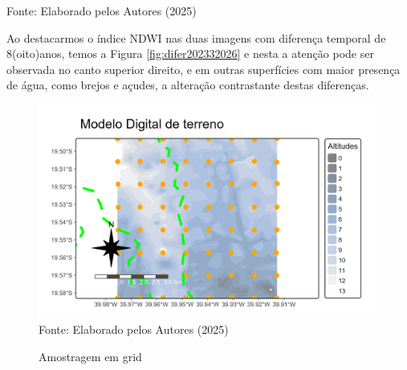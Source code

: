  			\begin{center}
 				Fonte:   Elaborado pelos Autores (2025)
 			\end{center}
 \hspace*{1.25 cm}  Ao destacarmos o índice NDWI nas duas imagens com diferença temporal de 8(oito)anos, temos a Figura   \ref{fig:difer202332026} e nesta a atenção pode ser observada no canto superior direito, e em outras superfícies com maior presença de água, como brejos e açudes, a alteração contrastante destas diferenças.  \\
  \begin{figure}
	\begin{center}
		\centering  \small \caption{Amostragem em grid}
		\includegraphics[width=0.97\linewidth]{FIGURAS/mdtamostras}
		\label{fig:mdtamostras}\\{ Fonte:   Elaborado pelos Autores (2025)}
	\end{center}
\end{figure} 


